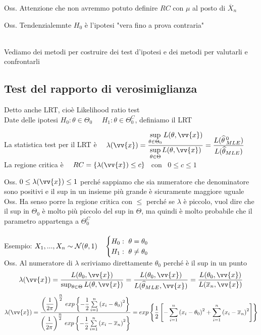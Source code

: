 Oss. Attenzione che non avremmo potuto definire $RC$ con $\mu$ al posto di $\overline{X}_n$

Oss. Tendenzialemnte $H_0$  è l'ipotesi "vera fino a prova contraria"\\ \\



Vediamo dei metodi per costruire dei test d'ipotesi e dei metodi per valutarli e confrontarli


\subsection{Test del rapporto di verosimiglianza}

Detto anche LRT, cioè Likelihood ratio test\\


Date delle ipotesi $H_0: \theta\in \Theta_0 \ \ \ \ \ \ H_1 : \theta\in\Theta_0^C$, definiamo il LRT\\
\begin{defi}
    La statistica test per il LRT è \ \ $\lambda(\vv{x})= \frac{\displaystyle\sup_{\theta\in\Theta_0} L(\theta,\vv{x})}{\displaystyle\sup_{\theta\in\Theta}L(\theta,\vv{x})} = \frac{L(\hat{\theta}\,^0_{MLE})}{L(\hat{\theta}_{MLE})} $\smallskip\smallskip\\
    La regione critica è \ \ $RC= \{\lambda(\vv{x})\le c\}$ \ con \ $0\le c\le 1$
\end{defi}

Oss. $0\le \lambda(\vv{x})\le 1$ perché sappiamo che sia numeratore che denominatore sono positivi e il sup in un insieme più grande è sicuramente maggiore uguale\\

Oss. Ha senso porre la regione critica con $\le$ perché se $\lambda$ è piccolo, vuol dire che il sup in $\Theta_0$ è molto più piccolo del sup in $\Theta$, ma quindi è molto probabile che il parametro appartenga a $\Theta^C_0$\\ \\



Esempio: $\camp \sim \Nc (\theta,1) \ \ \ \begin{cases}
H_0 :  \ \theta =\theta_0\\
H_1 :  \ \theta\ne \theta_0
\end{cases}$\\
Oss. Al numeratore di $\lambda$ scriviamo direttamente $\theta_0$ perché è il sup in un punto
\[
\lambda(\vv{x}) = \frac{L(\theta_0, \vv{x})}{\sup_{\theta\in\Theta} L(\theta, \vv{x})} = \frac{L(\theta_0,\vv{x})}{L(\hat{\theta}_{MLE}, \vv{x})} = \frac{L(\theta_0,\vv{x})}{L(\overline{x}_n, \vv{x})}
\]
\[
\lambda(\vv{x}) = \frac{\O\frac{1}{2\pi}\C^{\tfrac{n}{2}} \, exp\OOO -\frac12 \Sum{i=1}{n} \O x_i -\theta_0  \C^2  \CCC }{\O\frac{1}{2\pi}\C^{\tfrac{n}{2}} \, exp\OOO -\frac12 \Sum{i=1}{n} \O x_i -\overline{x}_n  \C^2  \CCC} = exp \OOO \frac12 \OO -\Sum{i=1}{n} \O x_i -\theta_0  \C^2   + \Sum{i=1}{n} \O x_i -\overline{x}_n  \C^2 \CC \CCC
\]

